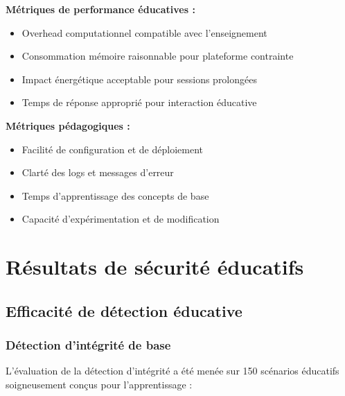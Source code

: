 \textbf{Métriques de performance éducatives :}
\begin{itemize}
    \item Overhead computationnel compatible avec l'enseignement
    \item Consommation mémoire raisonnable pour plateforme contrainte
    \item Impact énergétique acceptable pour sessions prolongées
    \item Temps de réponse approprié pour interaction éducative
\end{itemize}

\textbf{Métriques pédagogiques :}
\begin{itemize}
    \item Facilité de configuration et de déploiement
    \item Clarté des logs et messages d'erreur
    \item Temps d'apprentissage des concepts de base
    \item Capacité d'expérimentation et de modification
\end{itemize}

\section{Résultats de sécurité éducatifs}

\subsection{Efficacité de détection éducative}

\subsubsection{Détection d'intégrité de base}

L'évaluation de la détection d'intégrité a été menée sur 150 scénarios éducatifs soigneusement conçus pour l'apprentissage :

